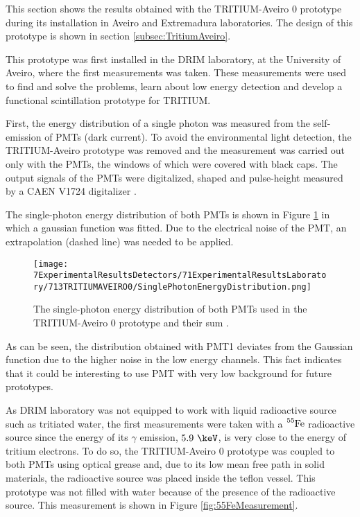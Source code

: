 This section shows the results obtained with the TRITIUM-Aveiro 0 prototype during its installation in Aveiro and Extremadura laboratories. The design of this prototype is shown in section \ref{subsec:TritiumAveiro}.

This prototype was first installed in the DRIM laboratory, at the University of Aveiro, where the first measurements was taken. These measurements were used to find and solve the problems, learn about low energy detection and develop a functional scintillation prototype for TRITIUM. 

First, the energy distribution of a single photon was measured from the self-emission of PMTs (dark current). To avoid the environmental light detection, the TRITIUM-Aveiro prototype was removed and the measurement was carried out only with the PMTs, the windows of which were covered with black caps. The output signals of the PMTs were digitalized, shaped and pulse-height measured by a CAEN V1724 digitalizer \cite{CAENV1724}.

The single-photon energy distribution of both PMTs is shown in Figure \ref{fig:SinglePhotonEnergyDistribution} in which a gaussian function was fitted. Due to the electrical noise of the PMT, an extrapolation (dashed line) was needed to be applied.

\begin{figure}[h]
\centering
\texttt{[image: 7ExperimentalResultsDetectors/71ExperimentalResultsLaboratory/713TRITIUMAVEIRO0/SinglePhotonEnergyDistribution.png]}
\caption{The single-photon energy distribution of both PMTs used in the TRITIUM-Aveiro 0 prototype and their sum \cite{ExperimentalPaperCarlos}.\label{fig:SinglePhotonEnergyDistribution}}
\end{figure}

As can be seen, the distribution obtained with PMT1 deviates from the Gaussian function due to the higher noise in the low energy channels. This fact indicates that it could be interesting to use PMT with very low background for future prototypes.

As DRIM laboratory was not equipped to work with liquid radioactive source such as tritiated water, the first measurements were taken with a $\ce{^{55}Fe}$ radioactive source since the energy of its $\gamma$ emission, $5.9~\keV$, is very close to the energy of tritium electrons. To do so, the TRITIUM-Aveiro 0 prototype was coupled to both PMTs using optical grease and, due to its low mean free path in solid materials, the radioactive source was placed inside the teflon vessel. This prototype was not filled with water because of the presence of the radioactive source. This measurement is shown in Figure \ref{fig:55FeMeasurement}.

